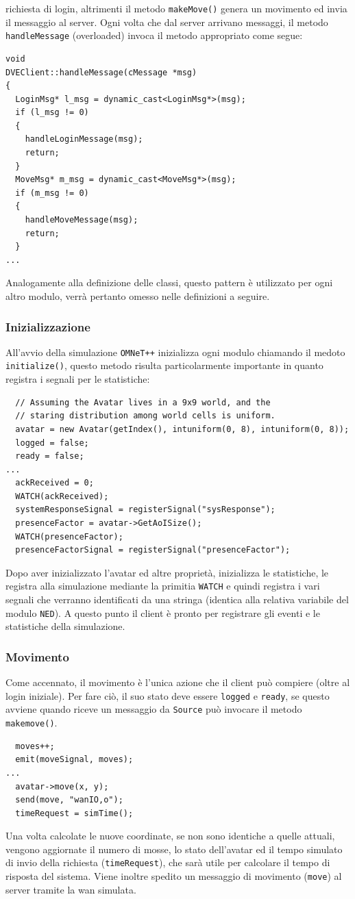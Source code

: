 \documentclass[a4paper, 11pt, oneside]{book}
\newcommand{\files}[1]{\texttt{#1}}
\theoremstyle{definition}
\theoremstyle{remark}
\begin{document}
richiesta di login, altrimenti il metodo \texttt{makeMove()} genera un movimento
ed invia il messaggio al server. Ogni volta che dal server arrivano messaggi,
il metodo \files{handleMessage} (overloaded) invoca il metodo appropriato
come segue:
\begin{lstlisting}
void
DVEClient::handleMessage(cMessage *msg)
{
  LoginMsg* l_msg = dynamic_cast<LoginMsg*>(msg);
  if (l_msg != 0)
  {
    handleLoginMessage(msg);
    return;
  }
  MoveMsg* m_msg = dynamic_cast<MoveMsg*>(msg);
  if (m_msg != 0)
  {
    handleMoveMessage(msg);
    return;
  }
...
\end{lstlisting}
Analogamente alla definizione delle classi, questo pattern è utilizzato per ogni
altro modulo, verrà pertanto omesso nelle definizioni a seguire.
\subsubsection{Inizializzazione}
All'avvio della simulazione \texttt{OMNeT++} inizializza ogni modulo chiamando
il medoto \texttt{initialize()}, questo metodo risulta particolarmente
importante in quanto registra i segnali per le statistiche:
\begin{lstlisting}
  // Assuming the Avatar lives in a 9x9 world, and the
  // staring distribution among world cells is uniform.
  avatar = new Avatar(getIndex(), intuniform(0, 8), intuniform(0, 8));
  logged = false;
  ready = false;
...
  ackReceived = 0;
  WATCH(ackReceived);
  systemResponseSignal = registerSignal("sysResponse");
  presenceFactor = avatar->GetAoISize();
  WATCH(presenceFactor);
  presenceFactorSignal = registerSignal("presenceFactor");
\end{lstlisting}
Dopo aver inizializzato l'avatar ed altre proprietà, inizializza le statistiche,
le registra alla simulazione mediante la primitia \texttt{WATCH} e quindi
registra i vari segnali che verranno identificati da una stringa (identica
alla relativa variabile del modulo \texttt{NED}). A questo punto il client è
pronto per registrare gli eventi e le statistiche della simulazione.

\subsubsection{Movimento}
Come accennato, il movimento è l'unica azione che il client può compiere
(oltre al login iniziale). Per fare ciò, il suo stato deve essere
\texttt{logged} e \texttt{ready}, se questo avviene quando riceve un messaggio
da \texttt{Source} può invocare il metodo \texttt{makemove()}.
\begin{lstlisting}
  moves++;
  emit(moveSignal, moves);
...
  avatar->move(x, y);
  send(move, "wanIO,o");
  timeRequest = simTime();
\end{lstlisting}
Una volta calcolate le nuove coordinate, se non sono identiche a quelle
attuali, vengono aggiornate il numero di mosse, lo stato dell'avatar ed il
tempo simulato di invio della richiesta
(\texttt{timeRequest}), che sarà utile per calcolare il
tempo di risposta del sistema. Viene inoltre spedito un messaggio di movimento
(\texttt{move}) al server tramite la wan simulata.
\end{document}
